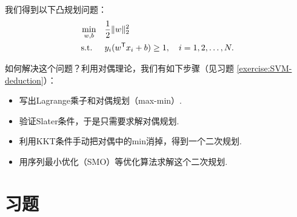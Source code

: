 我们得到以下凸规划问题：
\begin{align*}
    \min_{w,b}\quad&\frac{1}{2}\|w\|_2^2\\
    \text{s.t. }\quad &y_i(w^{\mathsf{T}} x_i+b)\geq 1,\quad i=1,2,\dots, N.
\end{align*}

如何解决这个问题？利用对偶理论，我们有如下步骤（见习题 \ref{exercise:SVM-deduction}）：
\begin{itemize}
    \item 写出Lagrange乘子和对偶规划（max-min）.
    \item 验证Slater条件，于是只需要求解对偶规划.
    \item 利用KKT条件手动把对偶中的min消掉，得到一个二次规划.
    \item 用序列最小优化（SMO）等优化算法求解这个二次规划.
\end{itemize}

\section{习题}

